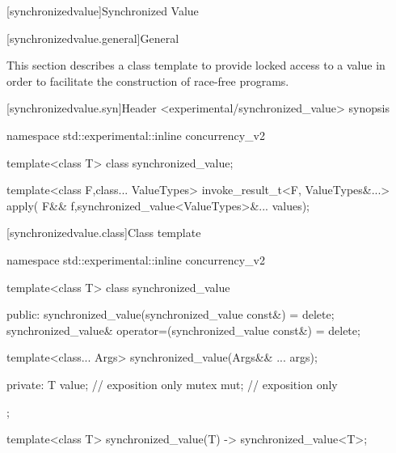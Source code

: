 \setcounter{chapter}{7}
[synchronizedvalue]{Synchronized Value}

[synchronizedvalue.general]{General}

This section describes a class template to provide locked access to a
value in order to facilitate the construction of race-free programs.

[synchronizedvalue.syn]{Header <experimental/synchronized_value> synopsis}

\begin{codeblock}
namespace std::experimental::inline concurrency_v2 {
    template<class T>
    class synchronized_value;

    template<class F,class... ValueTypes>
    invoke_result_t<F, ValueTypes&...> apply(
        F&& f,synchronized_value<ValueTypes>&... values);
}
\end{codeblock}

[synchronizedvalue.class]{Class template  }

\begin{codeblock}
namespace std::experimental::inline concurrency_v2 {
  template<class T>
    class synchronized_value
    {
    public:
        synchronized_value(synchronized_value const&) = delete;
        synchronized_value& operator=(synchronized_value const&) = delete;

        template<class... Args>
        synchronized_value(Args&& ... args);

    private:
        T value; // exposition only
        mutex mut; // exposition only
    };

template<class T>
synchronized_value(T)
-> synchronized_value<T>;
}
\end{codeblock}

